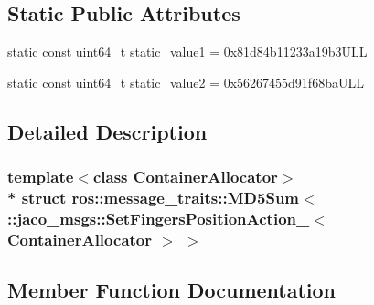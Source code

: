 \subsection*{Static Public Attributes}
\begin{DoxyCompactItemize}
\item 
static const uint64\+\_\+t \hyperlink{structros_1_1message__traits_1_1MD5Sum_3_01_1_1jaco__msgs_1_1SetFingersPositionAction___3_01ContainerAllocator_01_4_01_4_a25589453fab0cb34a4676ad678779a3e}{static\+\_\+value1} = 0x81d84b11233a19b3\+U\+LL
\item 
static const uint64\+\_\+t \hyperlink{structros_1_1message__traits_1_1MD5Sum_3_01_1_1jaco__msgs_1_1SetFingersPositionAction___3_01ContainerAllocator_01_4_01_4_af5f845032d3179f4fbac488b5a6ae424}{static\+\_\+value2} = 0x56267455d91f68ba\+U\+LL
\end{DoxyCompactItemize}


\subsection{Detailed Description}
\subsubsection*{template$<$class Container\+Allocator$>$\\*
struct ros\+::message\+\_\+traits\+::\+M\+D5\+Sum$<$ \+::jaco\+\_\+msgs\+::\+Set\+Fingers\+Position\+Action\+\_\+$<$ Container\+Allocator $>$ $>$}



\subsection{Member Function Documentation}
